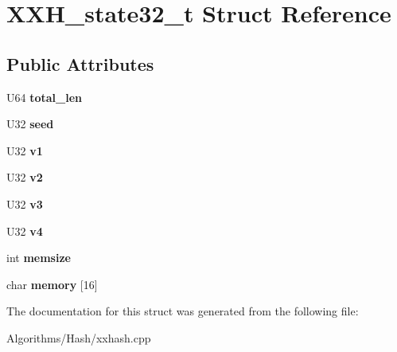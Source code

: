 \hypertarget{structXXH__state32__t}{\section{X\-X\-H\-\_\-state32\-\_\-t Struct Reference}
\label{structXXH__state32__t}
}
\subsection*{Public Attributes}
\begin{DoxyCompactItemize}
\item 
\hypertarget{structXXH__state32__t_a968184eb96ed6c2c47e77d0e7b2562e2}{U64 {\bfseries total\-\_\-len}}\label{structXXH__state32__t_a968184eb96ed6c2c47e77d0e7b2562e2}

\item 
\hypertarget{structXXH__state32__t_aa198d97d2ccb2e940e58c5676dd07b9f}{U32 {\bfseries seed}}\label{structXXH__state32__t_aa198d97d2ccb2e940e58c5676dd07b9f}

\item 
\hypertarget{structXXH__state32__t_a52d93caf96ab3cfa4d19faa232627402}{U32 {\bfseries v1}}\label{structXXH__state32__t_a52d93caf96ab3cfa4d19faa232627402}

\item 
\hypertarget{structXXH__state32__t_a77ca5f7d04bf820d40c0b849e69c932b}{U32 {\bfseries v2}}\label{structXXH__state32__t_a77ca5f7d04bf820d40c0b849e69c932b}

\item 
\hypertarget{structXXH__state32__t_a766430cd39ae981afd8a64d10329ec3d}{U32 {\bfseries v3}}\label{structXXH__state32__t_a766430cd39ae981afd8a64d10329ec3d}

\item 
\hypertarget{structXXH__state32__t_a33ede79f26b162219c1475e39766148d}{U32 {\bfseries v4}}\label{structXXH__state32__t_a33ede79f26b162219c1475e39766148d}

\item 
\hypertarget{structXXH__state32__t_a7d511c88afd3fc22cbdff9153af8424d}{int {\bfseries memsize}}\label{structXXH__state32__t_a7d511c88afd3fc22cbdff9153af8424d}

\item 
\hypertarget{structXXH__state32__t_ade592624e217dcdd46f37634992c2f98}{char {\bfseries memory} \mbox{[}16\mbox{]}}\label{structXXH__state32__t_ade592624e217dcdd46f37634992c2f98}

\end{DoxyCompactItemize}


The documentation for this struct was generated from the following file\-:\begin{DoxyCompactItemize}
\item 
Algorithms/\-Hash/xxhash.\-cpp\end{DoxyCompactItemize}
